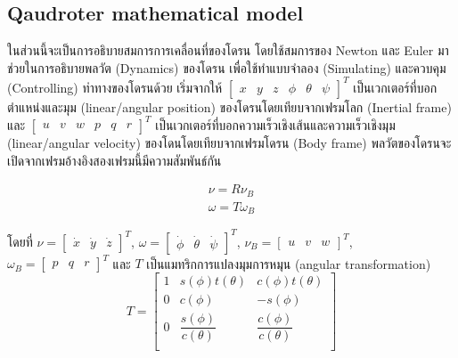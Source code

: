 
\clearpage
\subsection{Qaudroter mathematical model}
ในส่วนนี้จะเป็นการอธิบายสมการการเคลื่อนที่ของโดรน โดยใช้สมการของ Newton และ Euler มาช่วยในการอธิบายพลวัต (Dynamics) ของโดรน
เพื่อใช้ทำแบบจำลอง (Simulating) และควบคุม (Controlling) ท่าทางของโดรนด้วย
เริ่มจากให้ $[\begin{matrix}x & y & z & \phi & \theta & \psi \end{matrix}]^T$ เป็นเวกเตอร์ที่บอกตำแหน่งและมุม (linear/angular position)
ของโดรนโดยเทียบจากเฟรมโลก (Inertial frame) และ $[\begin{matrix}u & v & w & p & q & r\end{matrix}]^T$ เป็นเวกเตอร์ที่บอกความเร็วเชิงเส้นและความเร็วเชิงมุม
(linear/angular velocity) ของโดนโดยเทียบจากเฟรมโดรน (Body frame) พลวัตของโดรนจะเปิดจากเฟรมอ้างอิงสองเฟรมนี้มีความสัมพันธ์กัน

\begin{equation}
	\begin{array}{c}
		{\nu = R\nu_{B}}               \\
		{\omega = T\omega_{B}}         
		\label{equ:equation_of_motion} 
	\end{array}
\end{equation}

โดยที่ $\nu = [\begin{matrix}\dot{x} & \dot{y} & \dot{z} \end{matrix}]^T$, $\omega = [\begin{matrix}\dot\phi & \dot\theta & \dot\psi \end{matrix}]^T$,
$\nu_{B} = [\begin{matrix}u & v & w \end{matrix}]^T$, $\omega_{B} = [\begin{matrix}p & q & r \end{matrix}]^T$ และ $T$
เป็นแมทริกการแปลงมุมการหมุน (angular transformation)
\begin{equation}
	{T = \begin{bmatrix}
		1 & s(\phi)t(\theta) & c(\phi)t(\theta) \\
		0 & c(\phi) & -s(\phi) \\
		0 & \dfrac{s(\phi)}{c(\theta)}  & \dfrac{c(\phi)}{c(\theta)} \\
		\end{bmatrix}}
	\label{equ:angular_transformation}
\end{equation}

